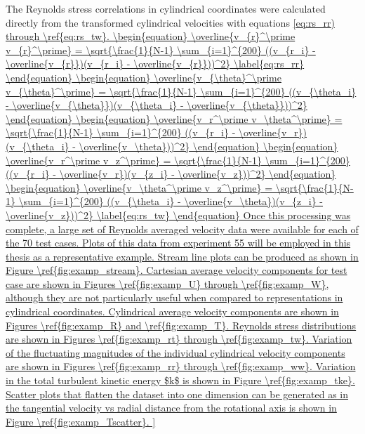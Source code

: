 The Reynolds stress correlations in cylindrical coordinates were calculated 
directly from the transformed cylindrical velocities with equations 
\ref{eq:rs_rr) through \ref{eq:rs_tw}.
	
\begin{equation}
\overline{v_{r}^\prime v_{r}^\prime} = \sqrt{\frac{1}{N-1} \sum_{i=1}^{200} 
	((v_{r_i} - \overline{v_{r}})(v_{r_i} - \overline{v_{r}}))^2}
\label{eq:rs_rr}
\end{equation}

\begin{equation}
\overline{v_{\theta}^\prime v_{\theta}^\prime} = \sqrt{\frac{1}{N-1} 
\sum_{i=1}^{200} 
	((v_{\theta_i} - \overline{v_{\theta}})(v_{\theta_i} - 
	\overline{v_{\theta}}))^2}
\end{equation}

\begin{equation}
\overline{v_r^\prime v_\theta^\prime} = \sqrt{\frac{1}{N-1} \sum_{i=1}^{200} 
	((v_{r_i} - \overline{v_r})(v_{\theta_i} - \overline{v_\theta}))^2}
\end{equation}

\begin{equation}
\overline{v_r^\prime v_z^\prime} = \sqrt{\frac{1}{N-1} \sum_{i=1}^{200} 
	((v_{r_i} - \overline{v_r})(v_{z_i} - \overline{v_z}))^2}
\end{equation}

\begin{equation}
\overline{v_\theta^\prime v_z^\prime} = \sqrt{\frac{1}{N-1} \sum_{i=1}^{200} 
	((v_{\theta_i} - \overline{v_\theta})(v_{z_i} - \overline{v_z}))^2}
\label{eq:rs_tw}
\end{equation}

	
Once this processing was complete, a large set of Reynolds averaged 
velocity data were available for each of the 70 test cases. Plots of this data 
from experiment 55 will be employed in this thesis as a representative example. 
Stream line plots can be produced as shown in 
Figure \ref{fig:examp_stream}. Cartesian average velocity components for test 
case are shown in Figures \ref{fig:examp_U} through \ref{fig:examp_W}, although 
they are not particularly useful when compared to representations in 
cylindrical coordinates. 
Cylindrical average velocity components are shown in Figures \ref{fig:examp_R} 
and \ref{fig:examp_T}. Reynolds stress distributions are shown in Figures 
\ref{fig:examp_rt} through \ref{fig:examp_tw}. Variation of the fluctuating 
magnitudes of the individual cylindrical velocity components are shown in 
Figures \ref{fig:examp_rr} through \ref{fig:examp_ww}. Variation in the total 
turbulent kinetic 
energy $k$ is shown in Figure \ref{fig:examp_tke}. Scatter plots that 
flatten the dataset into one dimension can be generated as in the tangential 
velocity vs radial distance from the rotational axis is shown in Figure 
\ref{fig:examp_Tscatter}. 

}
